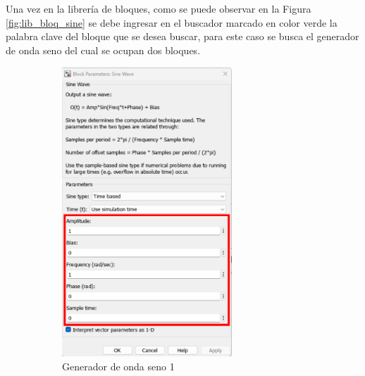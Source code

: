 Una vez en la librería de bloques, como se puede observar en la Figura \ref{fig:lib_bloq_sine} se debe ingresar en el buscador marcado en color verde la palabra clave del bloque que se desea buscar, para este caso se busca el generador de onda seno del cual se ocupan dos bloques. 

\begin{figure}[htbp]
    \centering
    \begin{subfigure}[b]{0.45\textwidth}
        \centering
        \includegraphics[width=0.7\textwidth]{fig/especifico_2/CASO_ESTUDIO_FILTRO/sinewave_1.pdf}
        \caption{Generador de onda seno 1}
        \label{fig:sine_gen_01}
    \end{subfigure}
    \hfill
    \begin{subfigure}[b]{0.45\textwidth}
        \centering

\end{subfigure}
\end{figure}
